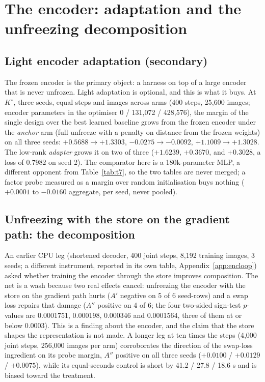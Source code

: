 \documentclass{article} %
\newcommand{\Kstar}{\ensuremath{K^{\star}}}
\begin{document}
\section{The encoder: adaptation and the unfreezing decomposition}
\label{app:encoder-main}

\subsection*{Light encoder adaptation (secondary)}

The frozen encoder is the primary object: a harness on top of a large encoder that is never
unfrozen. Light adaptation is optional, and this is what it buys. At $\Kstar$, three seeds,
equal steps and images across arms (400 steps, 25,600 images; encoder parameters in the
optimiser 0 / 131,072 / 428,576), the margin of the single design over the best learned
baseline grows from the frozen encoder under the \emph{anchor} arm (full unfreeze with a
penalty on distance from the frozen weights) on all three seeds: $+0.5688\to+1.3303$,
$-0.0275\to-0.0092$, $+1.1009\to+1.3028$. The low-rank \emph{adapter} grows it on two of
three ($+1.6239$, $+0.3670$, and $+0.3028$, a loss of $0.7982$ on seed 2).
The comparator here is a 180k-parameter MLP, a different opponent from Table~\ref{tab:t7}, so
the two tables are never merged; a factor probe measured as a margin over random
initialisation buys nothing ($+0.0001$ to $-0.0160$ aggregate, per seed, never pooled).

\subsection*{Unfreezing with the store on the gradient path: the decomposition}

An earlier CPU leg (shortened decoder, 400 joint steps, 8,192 training images, 3 seeds; a
different instrument, reported in its own table, Appendix~\ref{app:encloop}) asked whether
training the encoder through the store improves composition. The net is a wash because two
real effects cancel: unfreezing the encoder with the store on the gradient path hurts ($A'$
negative on 5 of 6 seed-rows) and a swap loss repairs that damage ($A''$ positive on 4 of 6;
the four two-sided sign-test $p$-values are 0.0001751, 0.000198, 0.000346 and 0.0001564, three
of them at or below 0.0003). This is a finding about the encoder, and the claim
that the store shapes the representation is not made. %
A longer leg at ten times the steps (4,000 joint steps, 256,000 images per arm) corroborates
the direction of the swap-loss ingredient on its probe margin, $A''$ positive on all three
seeds ($+0.0100$ / $+0.0129$ / $+0.0075$), while its equal-seconds control is short by 41.2 /
27.8 / 18.6 s and is biased toward the treatment. %
\end{document}
